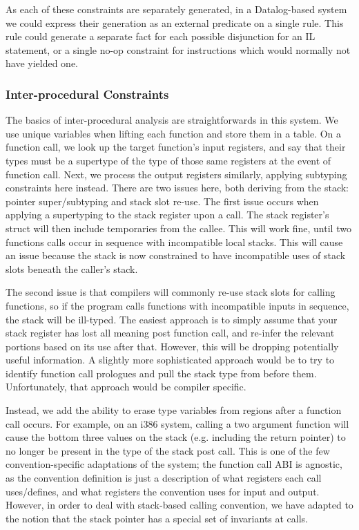 As each of these constraints are separately generated, in a Datalog-based system we could express their generation as an external predicate on a single rule.
This rule could generate a separate fact for each possible disjunction for an IL statement, or a single no-op constraint for instructions which would normally not have yielded one.

\subsubsection{Inter-procedural Constraints}
The basics of inter-procedural analysis are straightforwards in this system. We use unique variables when lifting each function and store them in a table. On a function call, we look up the target function's input registers, and say that their types must be a supertype of the type of those same registers at the event of function call. Next, we process the output registers similarly, applying subtyping constraints here instead. There are two issues here, both deriving from the stack: pointer super/subtyping and stack slot re-use. The first issue occurs when applying a supertyping to the stack register upon a call. The stack register's struct will then include temporaries from the callee.
This will work fine, until two functions calls occur in sequence with incompatible local stacks.
This will cause an issue because the stack is now constrained to have incompatible uses of stack slots beneath the caller's stack.

The second issue is that compilers will commonly re-use stack slots for calling functions, so if the program calls functions with incompatible inputs in sequence, the stack will be ill-typed. The easiest approach is to simply assume that your stack register has lost all meaning post function call, and re-infer the relevant portions based on its use after that. However, this will be dropping potentially useful information. A slightly more sophisticated approach would be to try to identify function call prologues and pull the stack type from before them. Unfortunately, that approach would be compiler specific.

Instead, we add the ability to erase type variables from regions after a function call occurs. For example, on an i386 system, calling a two argument function will cause the bottom three values on the stack (e.g. including the return pointer) to no longer be present in the type of the stack post call. This is one of the few convention-specific adaptations of the system; the function call ABI is agnostic, as the convention definition is just a description of what registers each call uses/defines, and what registers the convention uses for input and output. However, in order to deal with stack-based calling convention, we have adapted to the notion that the stack pointer has a special set of invariants at calls.

